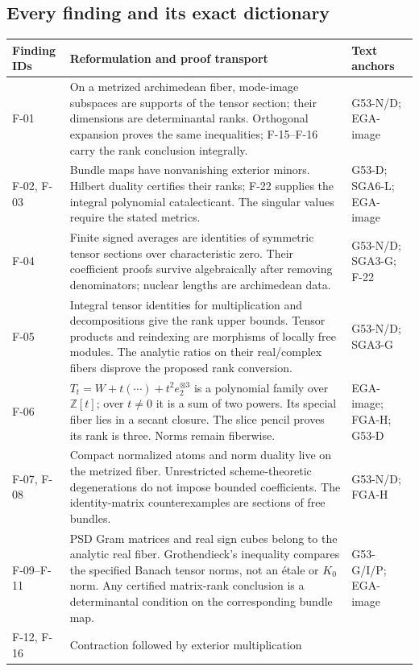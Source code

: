 \documentclass[11pt]{article}
\newcommand{\Z}{\mathbb Z}\newcommand{\Q}{\mathbb Q}
\begin{document}
\subsection{Every finding and its exact dictionary}
\begingroup\small
\begin{longtable}{p{1.8cm}p{9.0cm}p{2.1cm}}
\toprule
Finding IDs & Reformulation and proof transport & Text anchors\\\midrule
\endhead
F-01 & On a metrized archimedean fiber, mode-image subspaces
are supports of the tensor section; their dimensions are
determinantal ranks. Orthogonal expansion proves the same
inequalities; F-15--F-16 carry the rank conclusion integrally.
& G53-N/D; EGA-image\\
F-02, F-03 & Bundle maps have nonvanishing exterior minors.
Hilbert duality certifies their ranks; F-22 supplies the
integral polynomial catalecticant. The singular values require
the stated metrics.
& G53-D; SGA6-L; EGA-image\\
F-04 & Finite signed averages are identities of symmetric
tensor sections over characteristic zero. Their coefficient
proofs survive algebraically after removing denominators;
nuclear lengths are archimedean data.
& G53-N/D; SGA3-G; F-22\\
F-05 & Integral tensor identities for multiplication and
decompositions give the rank upper bounds. Tensor products
and reindexing are morphisms of locally free modules.
The analytic ratios on their real/complex fibers disprove
the proposed rank conversion.
& G53-N/D; SGA3-G\\
F-06 & $T_t=W+t(\cdots)+t^2e_2^{\otimes3}$ is a polynomial
family over $\Z[t]$; over $t\ne0$ it is a sum of two powers.
Its special fiber lies in a secant closure. The slice pencil
proves its rank is three. Norms remain fiberwise.
& EGA-image; FGA-H; G53-D\\
F-07, F-08 & Compact normalized atoms and norm duality live
on the metrized fiber. Unrestricted scheme-theoretic
degenerations do not impose bounded coefficients. The
identity-matrix counterexamples are sections of free bundles.
& G53-N/D; FGA-H\\
F-09--F-11 & PSD Gram matrices and real sign cubes belong
to the analytic real fiber. Grothendieck's inequality
compares the specified Banach tensor norms, not an
\'etale or $K_0$ norm. Any certified matrix-rank conclusion
is a determinantal condition on the corresponding bundle map.
& G53-G/I/P; EGA-image\\
F-12, F-16 & Contraction followed by exterior multiplication

\end{longtable}
\end{document}

